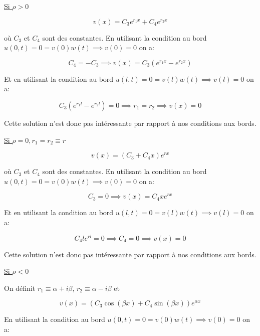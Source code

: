 \documentclass[a4paper, 12pt]{report}
\begin{document}
\underline{Si $\rho > 0$}

\begin{equation}
  v(x) = C_3 e^{r_1 x} + C_4 e^{r_2 x}
\end{equation}

où $C_3$ et $C_4$ sont des constantes. En utilisant la condition au bord
$u(0,t) = 0 = v(0) w(t) \implies v(0) = 0$ on a:

\begin{equation}
  C_4 = -C_3 \implies  v(x) = C_3 (e^{r_1 x} - e^{r_2 x})
\end{equation}

Et en utilisant la condition au bord $u(l,t) = 0 = v(l) w(t) \implies v(l) = 0$ on a:

\begin{equation}
  C_3 (e^{r_1 l} - e^{r_2 l}) = 0 \implies r_1 = r_2 \implies v(x) = 0
\end{equation}

Cette solution n'est donc pas intéressante par rapport à nos conditions aux bords.

\underline{Si $\rho = 0, r_1 = r_2 \equiv r$}

\begin{equation}
  v(x) = (C_3 + C_4 x) e^{r x}
\end{equation}

où $C_3$ et $C_4$ sont des constantes. En utilisant la condition au bord
$u(0,t) = 0 = v(0) w(t) \implies v(0) = 0$ on a:

\begin{equation}
  C_3 = 0 \implies   v(x) = C_4 x e^{r x}
\end{equation}

Et en utilisant la condition au bord $u(l,t) = 0 = v(l) w(t) \implies v(l) = 0$ on a:

\begin{equation}
  C_4 l e^{r l} = 0 \implies C_4 = 0 \implies v(x) = 0
\end{equation}

Cette solution n'est donc pas intéressante par rapport à nos conditions aux bords.

\underline{Si $\rho < 0$}

On définit $r_1 \equiv \alpha + i \beta$, $r_2 \equiv \alpha - i \beta$ et

\begin{equation}
  v(x) = (C_3 \cos(\beta x) + C_4 \sin(\beta x)) e^{\alpha x}
\end{equation}

En utilisant la condition au bord $u(0,t) = 0 = v(0) w(t) \implies v(0) = 0$ on a:
\end{document}
